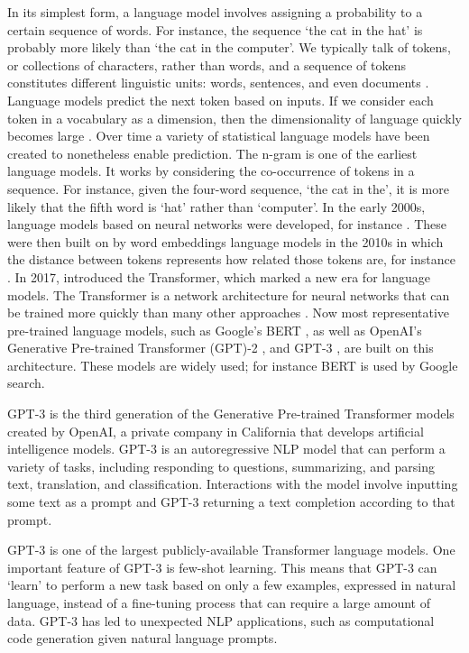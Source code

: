 \documentclass[12pt,]{article}
\begin{document}
In its simplest form, a language model involves assigning a probability to a certain sequence of words. For instance, the sequence `the cat in the hat' is probably more likely than `the cat in the computer'. We typically talk of tokens, or collections of characters, rather than words, and a sequence of tokens constitutes different linguistic units: words, sentences, and even documents \citep{bengio2003neural}. Language models predict the next token based on inputs. If we consider each token in a vocabulary as a dimension, then the dimensionality of language quickly becomes large \citep{rosenfeld2000two}. Over time a variety of statistical language models have been created to nonetheless enable prediction. The n-gram is one of the earliest language models. It works by considering the co-occurrence of tokens in a sequence. For instance, given the four-word sequence, `the cat in the', it is more likely that the fifth word is `hat' rather than `computer'. In the early 2000s, language models based on neural networks were developed, for instance \citet{bengio2003neural}. These were then built on by word embeddings language models in the 2010s in which the distance between tokens represents how related those tokens are, for instance \citet{turian2010word}. In 2017, \citet{vaswani2017attention} introduced the Transformer, which marked a new era for language models. The Transformer is a network architecture for neural networks that can be trained more quickly than many other approaches \citep{vaswani2017attention}. Now most representative pre-trained language models, such as Google's BERT \citep{devlin2018bert}, as well as OpenAI's Generative Pre-trained Transformer (GPT)-2 \citep{radford2019language}, and GPT-3 \citep{brown2020language}, are built on this architecture. These models are widely used; for instance BERT is used by Google search.

GPT-3 is the third generation of the Generative Pre-trained Transformer models created by OpenAI, a private company in California that develops artificial intelligence models. GPT-3 is an autoregressive NLP model that can perform a variety of tasks, including responding to questions, summarizing, and parsing text, translation, and classification. Interactions with the model involve inputting some text as a prompt and GPT-3 returning a text completion according to that prompt.

GPT-3 is one of the largest publicly-available Transformer language models. One important feature of GPT-3 is few-shot learning. This means that GPT-3 can `learn' to perform a new task based on only a few examples, expressed in natural language, instead of a fine-tuning process that can require a large amount of data. GPT-3 has led to unexpected NLP applications, such as computational code generation given natural language prompts.
\end{document}
